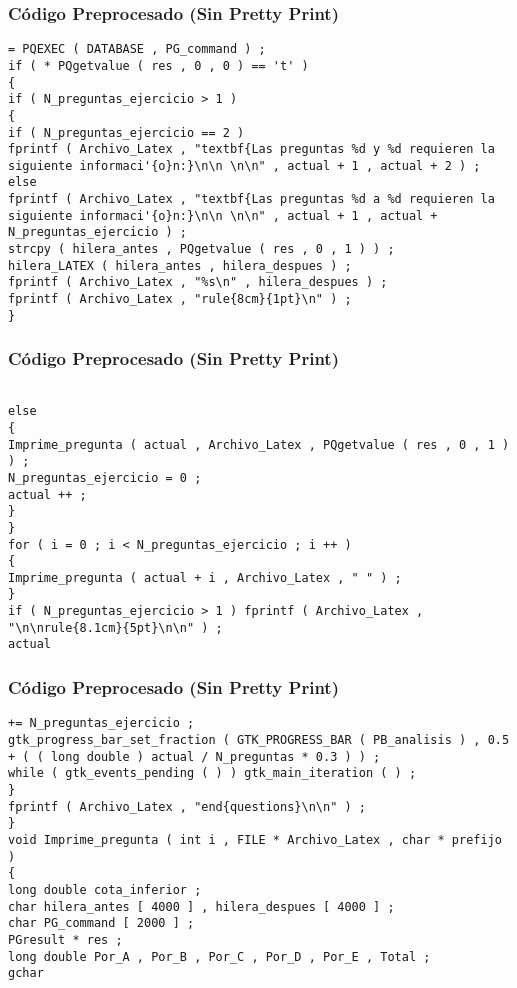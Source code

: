 \documentclass{beamer}
\begin{document}
\begin{frame}[fragile]
\frametitle{C\'odigo Preprocesado (Sin Pretty Print)}
\begin{lstlisting}[style=CStyle]
= PQEXEC ( DATABASE , PG_command ) ; 
if ( * PQgetvalue ( res , 0 , 0 ) == 't' ) 
{ 
if ( N_preguntas_ejercicio > 1 ) 
{ 
if ( N_preguntas_ejercicio == 2 ) 
fprintf ( Archivo_Latex , "textbf{Las preguntas %d y %d requieren la siguiente informaci'{o}n:}\n\n \n\n" , actual + 1 , actual + 2 ) ; 
else 
fprintf ( Archivo_Latex , "textbf{Las preguntas %d a %d requieren la siguiente informaci'{o}n:}\n\n \n\n" , actual + 1 , actual + N_preguntas_ejercicio ) ; 
strcpy ( hilera_antes , PQgetvalue ( res , 0 , 1 ) ) ; 
hilera_LATEX ( hilera_antes , hilera_despues ) ; 
fprintf ( Archivo_Latex , "%s\n" , hilera_despues ) ; 
fprintf ( Archivo_Latex , "rule{8cm}{1pt}\n" ) ; 
} \end{lstlisting}
\end{frame}
\begin{frame}[fragile]
\frametitle{C\'odigo Preprocesado (Sin Pretty Print)}
\begin{lstlisting}[style=CStyle]

else 
{ 
Imprime_pregunta ( actual , Archivo_Latex , PQgetvalue ( res , 0 , 1 ) ) ; 
N_preguntas_ejercicio = 0 ; 
actual ++ ; 
} 
} 
for ( i = 0 ; i < N_preguntas_ejercicio ; i ++ ) 
{ 
Imprime_pregunta ( actual + i , Archivo_Latex , " " ) ; 
} 
if ( N_preguntas_ejercicio > 1 ) fprintf ( Archivo_Latex , "\n\nrule{8.1cm}{5pt}\n\n" ) ; 
actual \end{lstlisting}
\end{frame}
\begin{frame}[fragile]
\frametitle{C\'odigo Preprocesado (Sin Pretty Print)}
\begin{lstlisting}[style=CStyle]
+= N_preguntas_ejercicio ; 
gtk_progress_bar_set_fraction ( GTK_PROGRESS_BAR ( PB_analisis ) , 0.5 + ( ( long double ) actual / N_preguntas * 0.3 ) ) ; 
while ( gtk_events_pending ( ) ) gtk_main_iteration ( ) ; 
} 
fprintf ( Archivo_Latex , "end{questions}\n\n" ) ; 
} 
void Imprime_pregunta ( int i , FILE * Archivo_Latex , char * prefijo ) 
{ 
long double cota_inferior ; 
char hilera_antes [ 4000 ] , hilera_despues [ 4000 ] ; 
char PG_command [ 2000 ] ; 
PGresult * res ; 
long double Por_A , Por_B , Por_C , Por_D , Por_E , Total ; 
gchar \end{lstlisting}
\end{frame}
\end{document}
